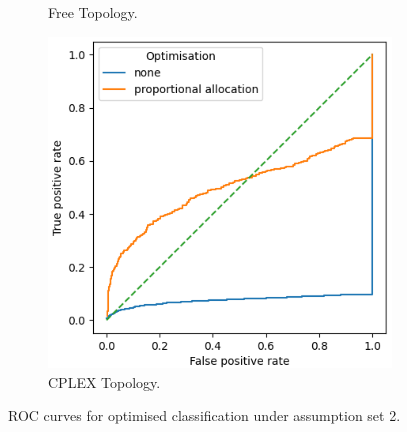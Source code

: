 \begin{figure}
\begin{subfigure}{0.475\textwidth}
        \caption{Free Topology.}
    \end{subfigure}
    \begin{subfigure}{0.475\textwidth}
        \includegraphics[width=\textwidth]{figs/results/norway_ac2_opt.png}
        \caption{CPLEX Topology.}
    \end{subfigure}
    \caption{ROC curves for optimised classification under assumption set 2.}
    \label{fig:RprobeoptA2ROCcurves}
\end{figure}

